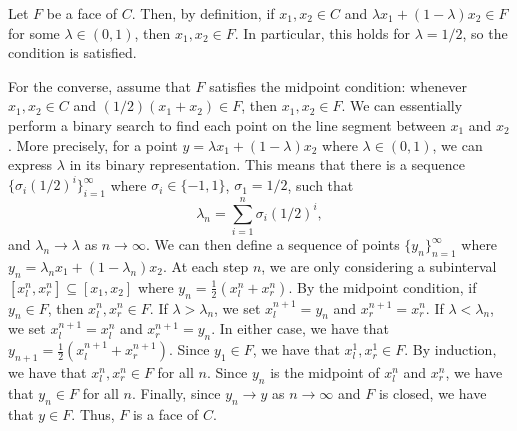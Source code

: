 \begin{solution}
  Let $F$ be a face of $C$.
  Then, by definition, if $x_1, x_2 \in C$ and $\lambda x_1 + (1 - \lambda) x_2 \in F$ for some $\lambda \in (0, 1)$, then $x_1, x_2 \in F$.
  In particular, this holds for $\lambda = 1/2$, so the condition is satisfied.

  For the converse, assume that $F$ satisfies the midpoint condition: whenever $x_1, x_2 \in C$ and $(1/2)(x_1 + x_2) \in F$, then $x_1, x_2 \in F$.
  We can essentially perform a binary search to find each point on the line segment between $x_1$ and $x_2$.
  More precisely, for a point $y = \lambda x_1 + (1 - \lambda) x_2$ where $\lambda \in (0, 1)$, we can express $\lambda$ in its binary representation.
  This means that there is a sequence $\{ \sigma_i (1/2)^i \}_{i=1}^\infty$ where $\sigma_i \in \{ -1, 1 \}$, $\sigma_1 = 1/2$, such that
  \begin{equation}
    \lambda_n = \sum_{i=1}^n \sigma_i (1/2)^i,
  \end{equation}
  and $\lambda_n \to \lambda$ as $n \to \infty$.
  We can then define a sequence of points $\{ y_n \}_{n=1}^\infty$ where $y_n = \lambda_n x_1 + (1 - \lambda_n) x_2$.
  At each step $n$, we are only considering a subinterval $[x_l^n, x_r^n] \subseteq [x_1, x_2]$ where $y_n = \frac{1}{2}(x_l^n + x_r^n)$.
  By the midpoint condition, if $y_n \in F$, then $x_l^n, x_r^n \in F$.
  If $\lambda > \lambda_n$, we set $x_l^{n+1} = y_n$ and $x_r^{n+1} = x_r^n$.
  If $\lambda < \lambda_n$, we set $x_l^{n+1} = x_l^n$ and $x_r^{n+1} = y_n$.
  In either case, we have that $y_{n+1} = \frac{1}{2}(x_l^{n+1} + x_r^{n+1})$.
  Since $y_1 \in F$, we have that $x_l^1, x_r^1 \in F$.
  By induction, we have that $x_l^n, x_r^n \in F$ for all $n$.
  Since $y_n$ is the midpoint of $x_l^n$ and $x_r^n$, we have that $y_n \in F$ for all $n$.
  Finally, since $y_n \to y$ as $n \to \infty$ and $F$ is closed, we have that $y \in F$.
  Thus, $F$ is a face of $C$.
\end{solution}